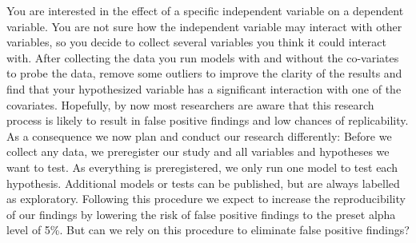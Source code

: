 You are interested in the effect of a specific independent variable on a dependent variable. You are not sure how the independent variable may interact with other variables, so you decide to collect several variables you think it could interact with. After collecting the data you run models with and without the co-variates to probe the data, remove some outliers to improve the clarity of the results and find that your hypothesized variable has a significant interaction with one of the covariates. Hopefully, by now most researchers are aware that this research process is likely to result in false positive findings and low chances of replicability. As a consequence we now plan and conduct our research differently: Before we collect any data, we preregister our study and all variables and hypotheses we want to test. As everything is preregistered, we only run one model to test each hypothesis. Additional models or tests can be published, but are always labelled as exploratory. Following this procedure we expect to increase the reproducibility of our findings by lowering the risk of false positive findings to the preset alpha level of 5\%. But can we rely on this procedure to eliminate false positive findings? \\

